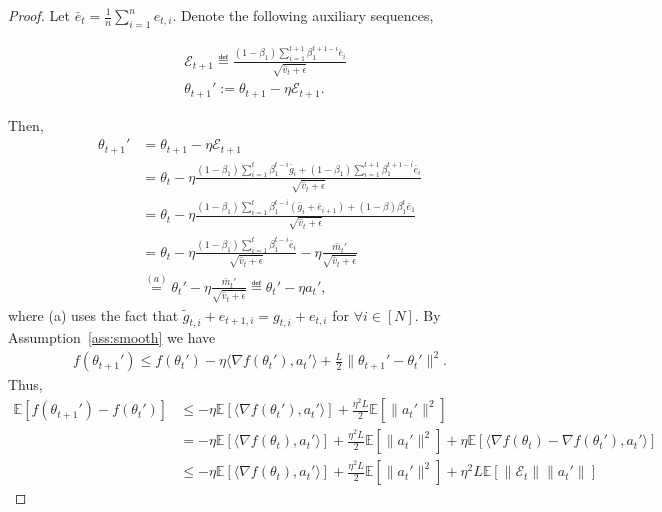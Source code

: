 \documentclass[11pt]{article}
\begin{document}
\begin{proof}
Let $\bar e_t=\frac{1}{n}\sum_{i=1}^n e_{t,i}$. Denote the following auxiliary sequences,

\begin{align*}
& \mathcal E_{t+1}\eqdef \frac{(1-\beta_1)\sum_{i=1}^{t+1} \beta_1^{t+1-i} \bar e_i}{\sqrt{\hat v_t+\epsilon}}\\
&\theta_{t+1}':=\theta_{t+1}-\eta\mathcal E_{t+1}.
\end{align*}

Then, 
\begin{align*}
    \theta_{t+1}'&=\theta_{t+1}-\eta\mathcal E_{t+1}\\
    &=\theta_t-\eta\frac{(1-\beta_1)\sum_{i=1}^{t} \beta_1^{t-i}\bar g_i+(1-\beta_1)\sum_{i=1}^{t+1} \beta_1^{t+1-i}\bar e_i}{\sqrt{\hat v_t+\epsilon}}\\
    &=\theta_t-\eta\frac{(1-\beta_1)\sum_{i=1}^{t} \beta_1^{t-i}(\bar g_i+\bar e_{i+1})+(1-\beta)\beta_1^t \bar e_1}{\sqrt{\hat v_t+\epsilon}}\\
    &=\theta_t-\eta\frac{(1-\beta_1)\sum_{i=1}^{t} \beta_1^{t-i} \bar e_i}{\sqrt{\hat v_t+\epsilon}}-\eta\frac{\bar m_t'}{\sqrt{\hat v_t+\epsilon}}\\
    &\overset{(a)}{=}\theta_t'-\eta\frac{\bar m_t'}{\sqrt{\hat v_t+\epsilon}}\eqdef \theta_t'-\eta a_t',
\end{align*}
where (a) uses the fact that $\tilde g_{t,i}+e_{t+1,i}=g_{t,i}+e_{t,i}$ for $\forall i\in [N]$. By Assumption~\ref{ass:smooth} we have
\begin{align*}
    f(\theta_{t+1}')\leq f(\theta_t')-\eta\langle \nabla f(\theta_t'), a_t'\rangle+\frac{L}{2}\| \theta_{t+1}'-\theta_t'\|^2.
\end{align*}
Thus,
\begin{align}
    \mathbb E[f(\theta_{t+1}')-f(\theta_t')]&\leq -\eta\mathbb E[\langle \nabla f(\theta_t'), a_t'\rangle]+\frac{\eta^2L}{2}\mathbb E[\|a_t'\|^2]\\
    &=-\eta\mathbb E[\langle \nabla f(\theta_t), a_t'\rangle]+\frac{\eta^2L}{2}\mathbb E[\|a_t'\|^2]+\eta\mathbb E[\langle \nabla f(\theta_t)-\nabla f(\theta_t'),a_t'\rangle]\\
    &\leq -\eta\mathbb E[\langle \nabla f(\theta_t), a_t'\rangle]+\frac{\eta^2L}{2}\mathbb E[\|a_t'\|^2]+\eta^2 L\mathbb E[\| \mathcal E_t\| \|a_t'\|] \label{eq0}
\end{align}


\end{proof}
\end{document}
